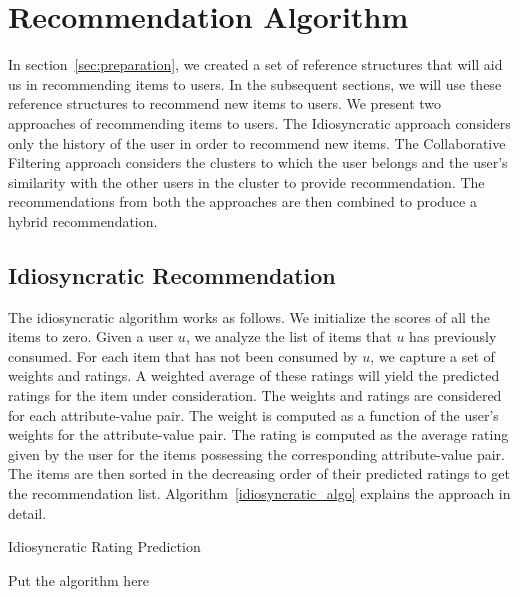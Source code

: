 \documentclass{acm_proc_article-sp}
\begin{document}
\section{Recommendation Algorithm}
In section~\ref{sec:preparation}, we created a set of reference structures that will aid us in recommending items to users. In the subsequent sections, we will use these reference structures to recommend new items to users. We present two approaches of recommending items to users. The Idiosyncratic approach considers only the history of the user in order to recommend new items. The Collaborative Filtering approach considers the clusters to which the user belongs and the user's similarity with the other users in the cluster to provide recommendation. The recommendations from both the approaches are then combined to produce a hybrid recommendation.

\subsection{Idiosyncratic Recommendation}
\label{sec:idiosyncratic}

The idiosyncratic algorithm works as follows. We initialize the scores of all the items to zero. Given a user $u$, we analyze the list of items that $u$ has previously consumed. For each item that has not been consumed by $u$, we capture a set of weights and ratings. A weighted average of these ratings will yield the predicted ratings for the item under consideration. The weights and ratings are considered for each attribute-value pair. The weight is computed as a function of the user's weights for the attribute-value pair. The rating is computed as the average rating given by the user for the items possessing the corresponding attribute-value pair. The items are then sorted in the decreasing order of their predicted ratings to get the recommendation list. Algorithm~\ref{idiosyncratic_algo} explains the approach in detail.

\begin{algorithm}
\label{idiosyncratic_algo}
\caption{Idiosyncratic Rating Prediction}
\begin{algorithmic}[1]
  \STATE Put the algorithm here
\end{algorithmic}
\end{algorithm}
\end{document}
